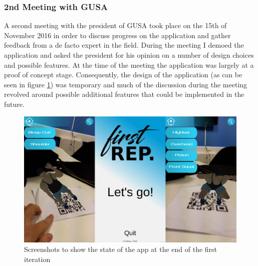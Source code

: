\documentclass{l4proj}
\begin{document}
\subsubsection{2nd Meeting with GUSA}
A second meeting with the president of GUSA took place on the 15th of November 2016 in order to discuss progress on the application and gather feedback from a de facto expert in the field. During the meeting I demoed the application and asked the president for his opinion on a number of design choices and possible features. At the time of the meeting the application was largely at a proof of concept stage. Consequently, the design of the application (as can be seen in figure \ref{fig:it1}) was temporary and much of the discussion during the meeting revolved around possible additional features that could be implemented in the future. 

\begin{figure}[h]
\centering
\includegraphics[width=\textwidth]{images/iteration1_screenshots.png}
\caption{Screenshots to show the state of the app at the end of the first iteration}
\label{fig:it1}
\end{figure}
\end{document}
